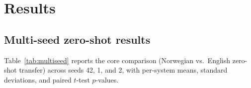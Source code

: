 \section{Results}
\label{sec:results}

\subsection{Multi-seed zero-shot results}

Table~\ref{tab:multiseed} reports the core comparison (Norwegian vs.\ English zero-shot transfer) across seeds 42, 1, and 2, with per-system means, standard deviations, and paired $t$-test $p$-values.

\begin{table}[t]
\centering
\small
{}
\caption{Multi-seed strict F1 (\%) for zero-shot transfer to Danish. ``---'' marks the EN mBERT seed-42 dev run, a known artifact excluded from comparisons (see Section~\ref{sec:analysis}). $p$-values from paired $t$-tests (NO vs EN within encoder). * $p<0.05$.}
\label{tab:multiseed}
\end{table}

